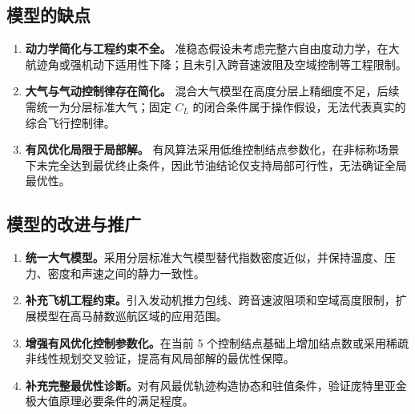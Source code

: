 \documentclass[withoutpreface,bwprint]{cumcmthesis}
\begin{document}
\subsection{模型的缺点}
\begin{enumerate}[left=0pt]
    \item \textbf{动力学简化与工程约束不全。} 准稳态假设未考虑完整六自由度动力学，在大航迹角或强机动下适用性下降；且未引入跨音速波阻及空域控制等工程限制。
    \item \textbf{大气与气动控制律存在简化。} 混合大气模型在高度分层上精细度不足，后续需统一为分层标准大气；固定 $C_L$ 的闭合条件属于操作假设，无法代表真实的综合飞行控制律。
    \item \textbf{有风优化局限于局部解。} 有风算法采用低维控制结点参数化，在非标称场景下未完全达到最优终止条件，因此节油结论仅支持局部可行性，无法确证全局最优性。
\end{enumerate}

\subsection{模型的改进与推广}

\begin{enumerate}[left=0pt]
\item \textbf{统一大气模型。}采用分层标准大气模型替代指数密度近似，并保持温度、压力、密度和声速之间的静力一致性。
\item \textbf{补充飞机工程约束。}引入发动机推力包线、跨音速波阻项和空域高度限制，扩展模型在高马赫数巡航区域的应用范围。
\item \textbf{增强有风优化控制参数化。}在当前 5 个控制结点基础上增加结点数或采用稀疏非线性规划交叉验证，提高有风局部解的最优性保障。
\item \textbf{补充完整最优性诊断。}对有风最优轨迹构造协态和驻值条件，验证庞特里亚金极大值原理必要条件的满足程度。
\end{enumerate}
\end{document}
